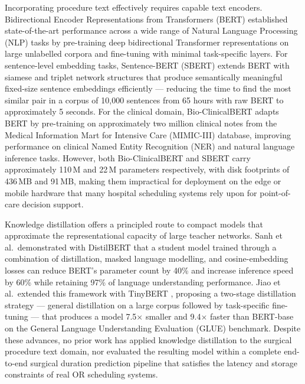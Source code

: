 Incorporating procedure text effectively requires capable text encoders. Bidirectional Encoder Representations from Transformers (BERT) \cite{devlin2019bert} established state-of-the-art performance across a wide range of Natural Language Processing (NLP) tasks by pre-training deep bidirectional Transformer representations on large unlabelled corpora and fine-tuning with minimal task-specific layers. For sentence-level embedding tasks, Sentence-BERT (SBERT) \cite{reimers2019sentence} extends BERT with siamese and triplet network structures that produce semantically meaningful fixed-size sentence embeddings efficiently — reducing the time to find the most similar pair in a corpus of 10{,}000 sentences from 65 hours with raw BERT to approximately 5 seconds. For the clinical domain, Bio-ClinicalBERT \cite{alsentzer2019publicly} adapts BERT by pre-training on approximately two million clinical notes from the Medical Information Mart for Intensive Care (MIMIC-III) database, improving performance on clinical Named Entity Recognition (NER) and natural language inference tasks. However, both Bio-ClinicalBERT and SBERT carry approximately 110\,M and 22\,M parameters respectively, with disk footprints of 436\,MB and 91\,MB, making them impractical for deployment on the edge or mobile hardware that many hospital scheduling systems rely upon for point-of-care decision support.

Knowledge distillation offers a principled route to compact models that approximate the representational capacity of large teacher networks. Sanh et al.\ demonstrated with DistilBERT \cite{sanh2019distilbert} that a student model trained through a combination of distillation, masked language modelling, and cosine-embedding losses can reduce BERT's parameter count by 40\% and increase inference speed by 60\% while retaining 97\% of language understanding performance. Jiao et al.\ extended this framework with TinyBERT \cite{jiao2020tinybert}, proposing a two-stage distillation strategy — general distillation on a large corpus followed by task-specific fine-tuning — that produces a model 7.5$\times$ smaller and 9.4$\times$ faster than BERT-base on the General Language Understanding Evaluation (GLUE) benchmark. Despite these advances, no prior work has applied knowledge distillation to the surgical procedure text domain, nor evaluated the resulting model within a complete end-to-end surgical duration prediction pipeline that satisfies the latency and storage constraints of real OR scheduling systems.

